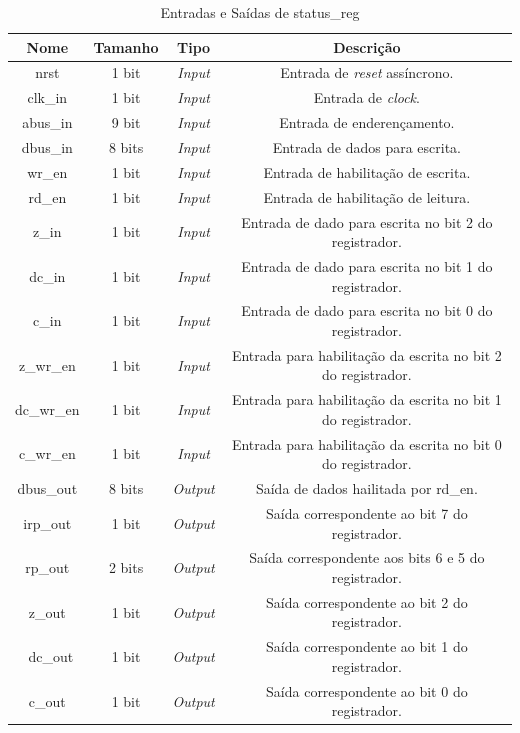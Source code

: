 \documentclass{article}
\begin{document}
\begin{table}[ht]
    \begin{center}
        \begin{tabular}{|c|c|c|c|}
            \hline
            Nome & Tamanho & Tipo & Descrição\\
            \hline
            nrst & 1 bit & \textit{Input} & Entrada de \textit{reset} assíncrono.\\
            \hline
            clk\_in & 1 bit & \textit{Input} & Entrada de \textit{clock}.\\
            \hline
            abus\_in & 9 bit & \textit{Input} & Entrada de enderençamento.\\
            \hline
            dbus\_in & 8 bits & \textit{Input} & Entrada de dados para escrita.\\
            \hline
            wr\_en & 1 bit & \textit{Input} & Entrada de habilitação de escrita.\\
            \hline
            rd\_en & 1 bit & \textit{Input} & Entrada de habilitação de leitura.\\
            \hline
            z\_in & 1 bit & \textit{Input} & Entrada de dado para escrita no bit 2 do registrador.\\
            \hline
            dc\_in & 1 bit & \textit{Input} & Entrada de dado para escrita no bit 1 do registrador.\\
            \hline
            c\_in & 1 bit & \textit{Input} & Entrada de dado para escrita no bit 0 do registrador.\\
            \hline
            z\_wr\_en & 1 bit & \textit{Input} & Entrada para habilitação da escrita no bit 2 do registrador.\\
            \hline
            dc\_wr\_en & 1 bit & \textit{Input} & Entrada para habilitação da escrita no bit 1 do registrador.\\
            \hline
            c\_wr\_en & 1 bit & \textit{Input} & Entrada para habilitação da escrita no bit 0 do registrador.\\
            \hline
            dbus\_out & 8 bits & \textit{Output} & Saída de dados hailitada por rd\_en.\\
            \hline
            irp\_out & 1 bit & \textit{Output} & Saída correspondente ao bit 7 do registrador.\\
            \hline
            rp\_out & 2 bits & \textit{Output} & Saída correspondente aos bits 6 e 5 do registrador.\\
            \hline
            z\_out & 1 bit & \textit{Output} & Saída correspondente ao bit 2 do registrador.\\
            \hline\
            dc\_out & 1 bit & \textit{Output} & Saída correspondente ao bit 1 do registrador.\\
            \hline
            c\_out & 1 bit & \textit{Output} & Saída correspondente ao bit 0 do registrador.\\
            \hline
        \end{tabular}
    \end{center}
    \caption{Entradas e Saídas de status\_reg}
\end{table}
\end{document}
